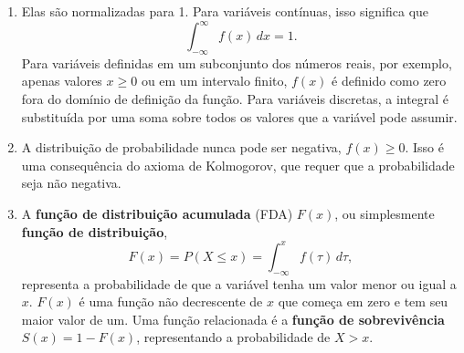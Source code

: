 \begin{enumerate}[noitemsep]
\item Elas são normalizadas para 1. Para variáveis contínuas, isso significa que 
\begin{equation}
\int_{-\infty}^{\infty} f(x)\,dx = 1.
\end{equation}
Para variáveis definidas em um subconjunto dos números reais, por exemplo, apenas valores $x \geq 0$ ou em um intervalo finito, $f(x)$ é definido como zero fora do domínio de definição da função. Para variáveis discretas, a integral é substituída por uma soma sobre todos os valores que a variável pode assumir.

\item A distribuição de probabilidade nunca pode ser negativa, $f(x) \geq 0$. Isso é uma consequência do axioma de Kolmogorov, que requer que a probabilidade seja não negativa.

\item A \textbf{função de distribuição acumulada} (FDA) $F(x)$, ou simplesmente \textbf{função de distribuição}, 
\begin{equation}
F(x) = P(X \leq x) = \int_{-\infty}^{x} f(\tau)\, d\tau,
\end{equation}
representa a probabilidade de que a variável tenha um valor menor ou igual a $x$. $F(x)$ é uma função não decrescente de $x$ que começa em zero e tem seu maior valor de um. Uma função relacionada é a \textbf{função de sobrevivência} $S(x) = 1 - F(x)$, representando a probabilidade de $X > x$.
\end{enumerate}

